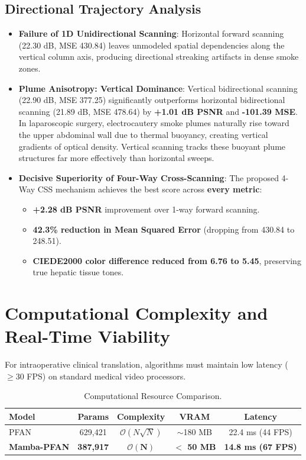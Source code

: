 \documentclass[conference]{IEEEtran}
\begin{document}
\subsection{Directional Trajectory Analysis}
\begin{itemize}
    \item \textbf{Failure of 1D Unidirectional Scanning}: Horizontal forward scanning (22.30 dB, MSE 430.84) leaves unmodeled spatial dependencies along the vertical column axis, producing directional streaking artifacts in dense smoke zones.
    \item \textbf{Plume Anisotropy: Vertical Dominance}: Vertical bidirectional scanning (22.90 dB, MSE 377.25) significantly outperforms horizontal bidirectional scanning (21.89 dB, MSE 478.64) by \textbf{+1.01 dB PSNR} and \textbf{-101.39 MSE}. In laparoscopic surgery, electrocautery smoke plumes naturally rise toward the upper abdominal wall due to thermal buoyancy, creating vertical gradients of optical density. Vertical scanning tracks these buoyant plume structures far more effectively than horizontal sweeps.
    \item \textbf{Decisive Superiority of Four-Way Cross-Scanning}: The proposed 4-Way CSS mechanism achieves the best score across \textbf{every metric}:
    \begin{itemize}
        \item \textbf{+2.28 dB PSNR} improvement over 1-way forward scanning.
        \item \textbf{42.3\% reduction in Mean Squared Error} (dropping from 430.84 to 248.51).
        \item \textbf{CIEDE2000 color difference reduced from 6.76 to 5.45}, preserving true hepatic tissue tones.
    \end{itemize}
\end{itemize}

\section{Computational Complexity and Real-Time Viability}
For intraoperative clinical translation, algorithms must maintain low latency ($\ge 30$ FPS) on standard medical video processors.

\begin{table}[h]
\centering
\caption{Computational Resource Comparison.}
\label{tab:complexity}
\begin{tabular}{lcccc}
\toprule
\textbf{Model} & \textbf{Params} & \textbf{Complexity} & \textbf{VRAM} & \textbf{Latency} \\
\midrule
PFAN \cite{pfan2024} & 629,421 & $\mathcal{O}(N \sqrt{N})$ & $\sim$180 MB & 22.4 ms (44 FPS) \\
\textbf{Mamba-PFAN} & \textbf{387,917} & $\mathbf{\mathcal{O}(N)}$ & \textbf{$<$ 50 MB} & \textbf{14.8 ms (67 FPS)} \\
\bottomrule
\end{tabular}
\end{table}
\end{document}
